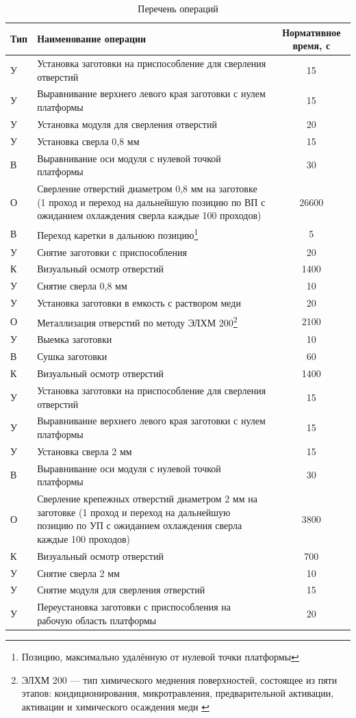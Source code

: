 \begingroup
	\centering
	\captionsetup[table]{skip=7pt} %
	\begin{longtable}[c]{|p{1cm}|p{11cm}|c|}
	\caption{Перечень операций}\label{tab:tp1}
	\\[-0.45\onelineskip]
	\hline
	Тип & Наименование операции & Нормативное время, с \tabularnewline \hline
		У & Установка заготовки на приспособление для сверления отверстий & 15 \tabularnewline \hline
		У & Выравнивание верхнего левого края заготовки с нулем платформы & 15 \tabularnewline \hline
		У & Установка модуля для сверления отверстий & 20 \tabularnewline \hline
		У & Установка сверла 0,8 мм & 15 \tabularnewline \hline
		В & Выравнивание оси модуля с нулевой точкой платформы & 30 \tabularnewline \hline
		О & Сверление отверстий диаметром 0,8 мм на заготовке (1 проход и переход на дальнейшую позицию по ВП с ожиданием охлаждения сверла каждые 100 проходов) & 26600 \tabularnewline \hline
		В & Переход каретки в дальнюю позицию\footnote{Позицию, максимально удалённую от нулевой точки платформы} & 5 \tabularnewline \hline
		У & Снятие заготовки с приспособления & 20 \tabularnewline \hline
		К & Визуальный осмотр отверстий & 1400 \tabularnewline \hline
		У & Снятие сверла 0,8 мм & 10 \tabularnewline \hline
		У & Установка заготовки в емкость с раствором меди & 20 \tabularnewline \hline
		О & Металлизация отверстий по методу ЭЛХМ 200\footnote{ЭЛХМ 200 --- тип химического меднения поверхностей, состоящее из пяти этапов: кондиционирования, микротравления, предварительной активации, активации и химического осаждения меди \cite{elhm200}} & 2100 \tabularnewline \hline
		У & Выемка заготовки & 10 \tabularnewline \hline
		В & Сушка заготовки & 60 \tabularnewline \hline
		К & Визуальный осмотр отверстий & 1400 \tabularnewline \hline
		У & Установка заготовки на приспособление для сверления отверстий & 15 \tabularnewline \hline
		У & Выравнивание верхнего левого края заготовки с нулем платформы & 15 \tabularnewline \hline
		У & Установка сверла 2 мм & 15 \tabularnewline \hline
		В & Выравнивание оси модуля с нулевой точкой платформы & 30 \tabularnewline \hline
		О & Сверление крепежных отверстий диаметром 2 мм на заготовке (1 проход и переход на дальнейшую позицию по УП с ожиданием охлаждения сверла каждые 100 проходов) & 3800 \tabularnewline \hline
		К & Визуальный осмотр отверстий & 700 \tabularnewline \hline
		У & Снятие сверла 2 мм & 10 \tabularnewline \hline
		У & Снятие модуля для сверления отверстий & 15 \tabularnewline \hline
		У & Переустановка заготовки с приспособления на рабочую область платформы & 20 \tabularnewline \hline

\end{longtable}
